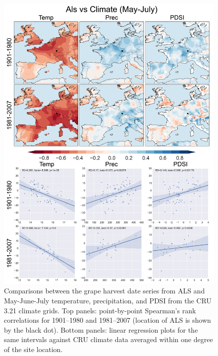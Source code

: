 \documentclass[12pt]{article}
\begin{document}
\begin{figure}
\center
\includegraphics[width=.9\columnwidth,scale=2]{SUPP_fig_04_Als_MJJ_climate_onedeg_withtrend.png}
\caption{Comparisons between the grape harvest date series from ALS and May-June-July temperature, precipitation, and PDSI from the CRU 3.21 climate grids. Top panels: point-by-point Spearman's rank correlations for 1901--1980 and 1981--2007 (location of ALS is shown by the black dot). Bottom panels: linear regression plots for the same intervals against CRU climate data averaged within one degree of the site location.}
\end{figure}
\end{document}
